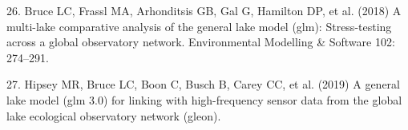 \documentclass[
]{article}
\begin{document}
\leavevmode\hypertarget{ref-bruce2018multi}{}%
26. Bruce LC, Frassl MA, Arhonditsis GB, Gal G, Hamilton DP, et al.
(2018) A multi-lake comparative analysis of the general lake model
(glm): Stress-testing across a global observatory network. Environmental
Modelling \& Software 102: 274--291.

\leavevmode\hypertarget{ref-hipsey2019general}{}%
27. Hipsey MR, Bruce LC, Boon C, Busch B, Carey CC, et al. (2019) A
general lake model (glm 3.0) for linking with high-frequency sensor data
from the global lake ecological observatory network (gleon).
\end{document}
